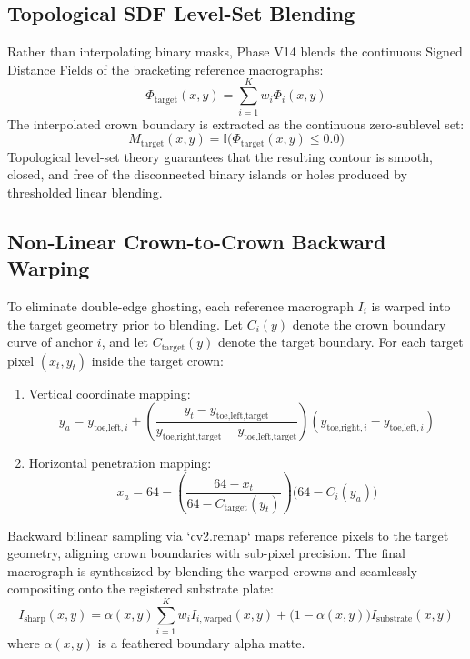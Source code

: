 \documentclass[12pt,a4paper,oneside]{report}
\begin{document}
\subsection{Topological SDF Level-Set Blending}
Rather than interpolating binary masks, Phase V14 blends the continuous Signed Distance Fields of the bracketing reference macrographs:
\begin{equation}
    \Phi_{\text{target}}(x, y) = \sum_{i=1}^{K} w_i \Phi_i(x, y)
\end{equation}
The interpolated crown boundary is extracted as the continuous zero-sublevel set:
\begin{equation}
    M_{\text{target}}(x, y) = \mathbb{I}\big(\Phi_{\text{target}}(x, y) \le 0.0\big)
\end{equation}
Topological level-set theory guarantees that the resulting contour is smooth, closed, and free of the disconnected binary islands or holes produced by thresholded linear blending.

\subsection{Non-Linear Crown-to-Crown Backward Warping}
To eliminate double-edge ghosting, each reference macrograph $I_i$ is warped into the target geometry prior to blending. Let $C_i(y)$ denote the crown boundary curve of anchor $i$, and let $C_{\text{target}}(y)$ denote the target boundary. For each target pixel $(x_t, y_t)$ inside the target crown:
\begin{enumerate}
    \item Vertical coordinate mapping:
    \begin{equation}
        y_a = y_{\text{toe,left}, i} + \left( \frac{y_t - y_{\text{toe,left}, \text{target}}}{y_{\text{toe,right}, \text{target}} - y_{\text{toe,left}, \text{target}}} \right) (y_{\text{toe,right}, i} - y_{\text{toe,left}, i})
    \end{equation}
    \item Horizontal penetration mapping:
    \begin{equation}
        x_a = 64 - \left( \frac{64 - x_t}{64 - C_{\text{target}}(y_t)} \right) \big(64 - C_i(y_a)\big)
    \end{equation}
\end{enumerate}
Backward bilinear sampling via `cv2.remap` maps reference pixels to the target geometry, aligning crown boundaries with sub-pixel precision. The final macrograph is synthesized by blending the warped crowns and seamlessly compositing onto the registered substrate plate:
\begin{equation}
    I_{\text{sharp}}(x, y) = \alpha(x, y) \sum_{i=1}^{K} w_i I_{i, \text{warped}}(x, y) + \big(1 - \alpha(x, y)\big) I_{\text{substrate}}(x, y)
\end{equation}
where $\alpha(x, y)$ is a feathered boundary alpha matte.
\end{document}
